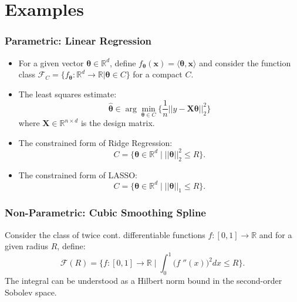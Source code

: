 \documentclass[11pt]{beamer}
\newcommand{\bx}{\mathbf{x}}
\newcommand{\cF}{\mathcal{F}}
\begin{document}
	\section{Examples}
	\frame{\sectionpage}
		\begin{frame}
		\frametitle{Parametric: Linear Regression}
		
		\begin{itemize}
			\item For a given vector $\boldsymbol{\theta} \in \mathbb{R}^d$, define  $f_{\boldsymbol{\theta}}(\bx) = \langle \boldsymbol{\theta}, \bx \rangle$ and consider the function class
			$\cF_C = \{f_{\boldsymbol{\theta}}: \mathbb{R}^d \to \mathbb{R} | \boldsymbol{\theta} \in C\}$
			for a compact $C$.
			\item The least squares estimate:
			\begin{equation*}
			\widehat{\boldsymbol{\theta}} \in \arg\min_{\boldsymbol{\theta} \in C} \Bigg\{\frac{1}{n} ||y - \mathbf{X}\boldsymbol{\theta}||_2^2\Bigg\}
			\end{equation*}
			where $\mathbf{X} \in \mathbb{R}^{n\times d}$ is the design matrix.
		\end{itemize}
		
		 
		\begin{itemize}
			\item The constrained form of Ridge Regression:
			\begin{equation*}
				C = \big\{\boldsymbol{\theta}\in \mathbb{R}^d \;\big|\; ||\boldsymbol{\theta}||_2^2\leq R\big\}.
			\end{equation*}
			
			\item The constrained form of LASSO:
			\begin{equation*}
			C = \big\{\boldsymbol{\boldsymbol{\theta}} \in \mathbb{R}^d \;\big|\; ||\boldsymbol{\theta}||_1\leq R\big\}.
			\end{equation*}
		\end{itemize}		
		\end{frame}
	
		\begin{frame}

		\frametitle{Non-Parametric: Cubic Smoothing Spline}
		Consider the class of twice cont. differentiable functions $f: [0, 1] \to \mathbb{R}$ and for a given radius $R$, define:
		\begin{equation*}
		\cF(R) = \Bigg\{f: [0, 1] \rightarrow \mathbb{R} \;\Bigg|\; \int_{0}^{1} \Big(f\;''(x)\Big)^2 dx \leq R\Bigg\}.
		\end{equation*}
		The integral can be understood as a Hilbert norm bound in the second-order Sobolev space.
		\end{frame}
	
\end{document}
